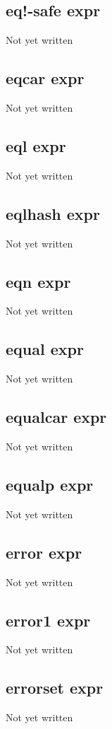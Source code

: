 \documentclass[a4paper,11pt]{article}
\begin{document}
{\subsection{\ttfamily eq!-safe expr}
   Not yet written

\subsection{\ttfamily eqcar expr}
   Not yet written

\subsection{\ttfamily eql expr}
   Not yet written

\subsection{\ttfamily eqlhash expr}
   Not yet written

\subsection{\ttfamily eqn expr}
   Not yet written

\subsection{\ttfamily equal expr}
   Not yet written

\subsection{\ttfamily equalcar expr}
   Not yet written

\subsection{\ttfamily equalp expr}
   Not yet written

\subsection{\ttfamily error expr}
   Not yet written

\subsection{\ttfamily error1 expr}
   Not yet written

\subsection{\ttfamily errorset expr}
   Not yet written

}
\end{document}
